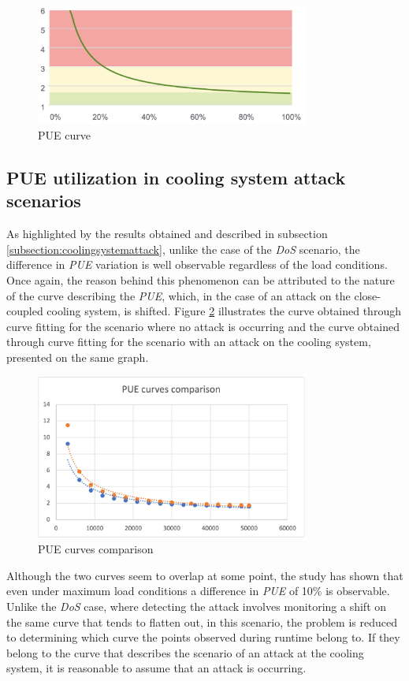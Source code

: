 \begin{figure}[h]
    \centering
    \includegraphics[width=0.8\textwidth]{chapters/images/pue_curve.png}
    \caption{PUE curve}
    \label{fig:pue_curve}
\end{figure}

\subsection{PUE utilization in cooling system attack scenarios}
As highlighted by the results obtained and described in subsection \ref{subsection:coolingsystemattack}, unlike the case of the \emph{DoS} scenario, the difference in \emph{PUE} variation is well observable regardless of the load conditions. Once again, the reason behind this phenomenon can be attributed to the nature of the curve describing the \emph{PUE}, which, in the case of an attack on the close-coupled cooling system, is shifted. Figure \ref{fig:pue_curves_comp} illustrates the curve obtained through curve fitting for the scenario where no attack is occurring and the curve obtained through curve fitting for the scenario with an attack on the cooling system, presented on the same graph.
\begin{figure}[h]
    \centering
    \includegraphics[width=0.8\textwidth]{chapters/images/pue_curves_comp.png}
    \caption{PUE curves comparison}
    \label{fig:pue_curves_comp}
\end{figure}
Although the two curves seem to overlap at some point, the study has shown that even under maximum load conditions a difference in \emph{PUE} of 10\% is observable. Unlike the \emph{DoS} case, where detecting the attack involves monitoring a shift on the same curve that tends to flatten out, in this scenario, the problem is reduced to determining which curve the points observed during runtime belong to. If they belong to the curve that describes the scenario of an attack at the cooling system, it is reasonable to assume that an attack is occurring.
